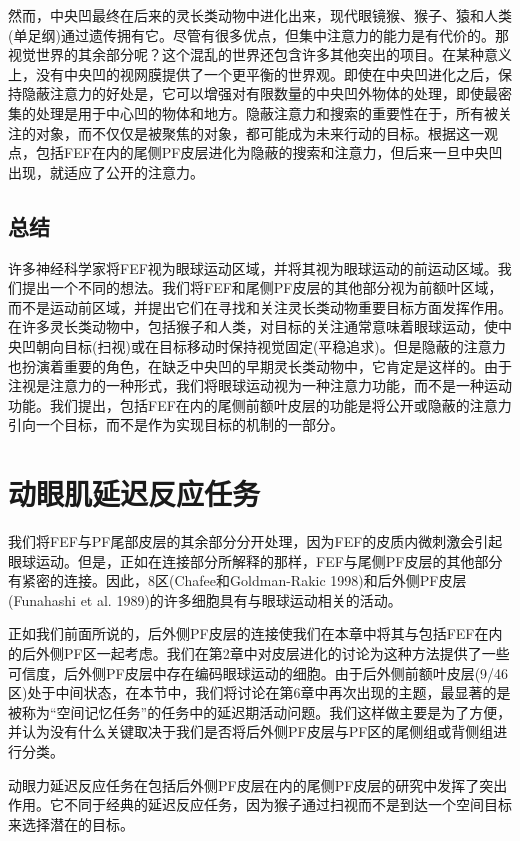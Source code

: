 然而，中央凹最终在后来的灵长类动物中进化出来，现代眼镜猴、猴子、猿和人类(单足纲)通过遗传拥有它。尽管有很多优点，但集中注意力的能力是有代价的。那视觉世界的其余部分呢？这个混乱的世界还包含许多其他突出的项目。在某种意义上，没有中央凹的视网膜提供了一个更平衡的世界观。即使在中央凹进化之后，保持隐蔽注意力的好处是，它可以增强对有限数量的中央凹外物体的处理，即使最密集的处理是用于中心凹的物体和地方。隐蔽注意力和搜索的重要性在于，所有被关注的对象，而不仅仅是被聚焦的对象，都可能成为未来行动的目标。根据这一观点，包括FEF在内的尾侧PF皮层进化为隐蔽的搜索和注意力，但后来一旦中央凹出现，就适应了公开的注意力。
\subsection{总结}
许多神经科学家将FEF视为眼球运动区域，并将其视为眼球运动的前运动区域。我们提出一个不同的想法。我们将FEF和尾侧PF皮层的其他部分视为前额叶区域，而不是运动前区域，并提出它们在寻找和关注灵长类动物重要目标方面发挥作用。在许多灵长类动物中，包括猴子和人类，对目标的关注通常意味着眼球运动，使中央凹朝向目标(扫视)或在目标移动时保持视觉固定(平稳追求)。但是隐蔽的注意力也扮演着重要的角色，在缺乏中央凹的早期灵长类动物中，它肯定是这样的。由于注视是注意力的一种形式，我们将眼球运动视为一种注意力功能，而不是一种运动功能。我们提出，包括FEF在内的尾侧前额叶皮层的功能是将公开或隐蔽的注意力引向一个目标，而不是作为实现目标的机制的一部分。

\section{动眼肌延迟反应任务}
我们将FEF与PF尾部皮层的其余部分分开处理，因为FEF的皮质内微刺激会引起眼球运动。但是，正如在连接部分所解释的那样，FEF与尾侧PF皮层的其他部分有紧密的连接。因此，8区(Chafee和Goldman-Rakic 1998)和后外侧PF皮层(Funahashi et al. 1989)的许多细胞具有与眼球运动相关的活动。

正如我们前面所说的，后外侧PF皮层的连接使我们在本章中将其与包括FEF在内的后外侧PF区一起考虑。我们在第2章中对皮层进化的讨论为这种方法提供了一些可信度，后外侧PF皮层中存在编码眼球运动的细胞。由于后外侧前额叶皮层(9/46区)处于中间状态，在本节中，我们将讨论在第6章中再次出现的主题，最显著的是被称为“空间记忆任务”的任务中的延迟期活动问题。我们这样做主要是为了方便，并认为没有什么关键取决于我们是否将后外侧PF皮层与PF区的尾侧组或背侧组进行分类。

动眼力延迟反应任务在包括后外侧PF皮层在内的尾侧PF皮层的研究中发挥了突出作用。它不同于经典的延迟反应任务，因为猴子通过扫视而不是到达一个空间目标来选择潜在的目标。

